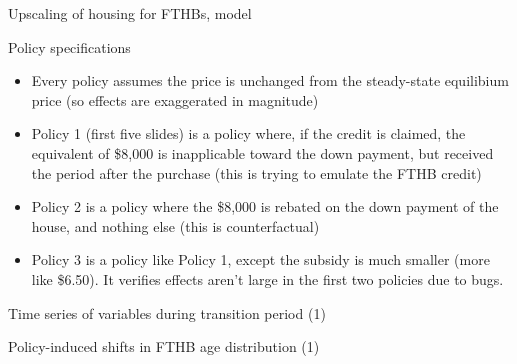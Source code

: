 \documentclass[9pt]{beamer}
\def \mdir{matlab}
\begin{document}
\begin{frame}{Upscaling of housing for FTHBs, model}

\end{frame}

{
}

\begin{frame}{Policy specifications}

\begin{itemize}
        \item Every policy assumes the price is unchanged from the steady-state
                equilibium price (so effects are exaggerated in magnitude)
        \item Policy 1 (first five slides) is a policy where, if the credit is
                claimed, the equivalent of \$8,000 is inapplicable toward the
                down payment, but received the period after the purchase
                (this is trying to emulate the FTHB credit)
        \item Policy 2 is a policy where the \$8,000 is
               rebated on the down payment of the house, and nothing
              else (this is counterfactual)
        \item Policy 3 is a policy like Policy 1, except the subsidy is
              much smaller (more like \$6.50). It verifies effects aren't
              large in the first two policies due to bugs.

\end{itemize}

\end{frame}


\begin{frame}{Time series of variables during transition period (1)}

\end{frame}

\begin{frame}{Policy-induced shifts in FTHB age distribution (1)}

\end{frame}
\end{document}
